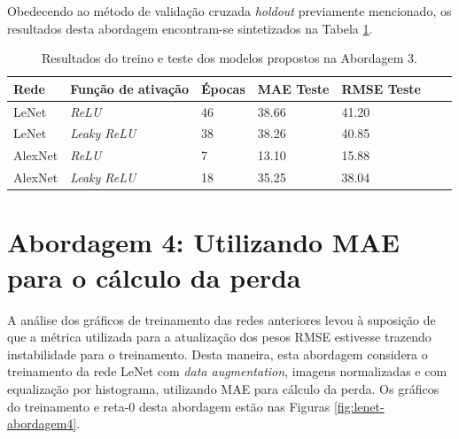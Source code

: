 	Obedecendo ao método de validação cruzada \emph{holdout} previamente mencionado, os resultados desta abordagem encontram-se sintetizados na Tabela \ref{tab:results-3}.

	\begin{table}[!ht]
		\caption{Resultados do treino e teste dos modelos propostos na Abordagem 3.}
		\label{tab:results-3}
		\centering
		\begin{tabular}{l l l l l l l}
				\toprule
				Rede & Função de ativação & Épocas & MAE Teste & RMSE Teste \\
				\midrule
				LeNet & \emph{ReLU} & 46 &  38.66 & 41.20 \\
				LeNet & \emph{Leaky ReLU} &  38 & 38.26 & 40.85 \\
				AlexNet & \emph{ReLU} & 7 & 13.10 & 15.88 \\
				AlexNet & \emph{Leaky ReLU} & 18 & 35.25 & 38.04 \\
				\bottomrule
			\end{tabular}
	\end{table}

\section{Abordagem 4: Utilizando MAE para o cálculo da perda}%
	A análise dos gráficos de treinamento das redes anteriores levou à suposição de que a métrica utilizada para a atualização dos pesos RMSE estivesse trazendo instabilidade para o treinamento. Desta maneira, esta abordagem considera o treinamento da rede LeNet com \emph{data augmentation}, imagens normalizadas e com equalização por histograma, utilizando MAE para cálculo da perda. Os gráficos do treinamento e reta-0 desta abordagem estão nas Figuras \ref{fig:lenet-abordagem4}.


